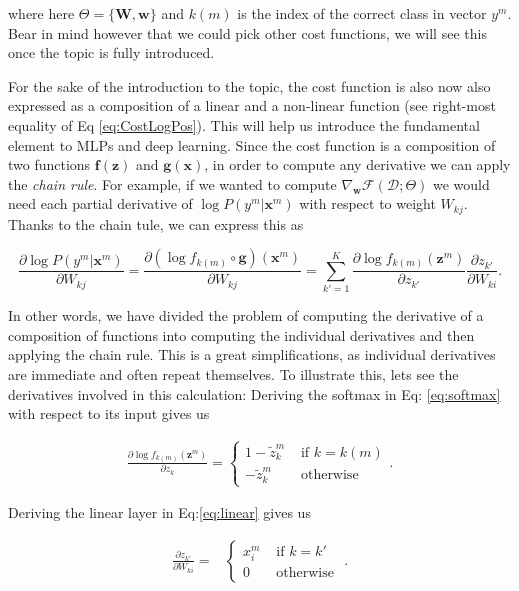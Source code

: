 where here $\Theta=\{\mathbf{W}, \mathbf{w}\}$ and $k(m)$ is the index of the correct class in vector $y^m$. 
Bear in mind however that we could pick other cost functions, we will see this once the topic is fully introduced.

For the sake of the introduction to the topic, the cost function is also now also expressed as a composition of a linear and a non-linear function (see right-most equality of Eq \ref{eq:CostLogPos}). This will help us introduce the fundamental element to MLPs and deep learning. Since the cost function is a composition of two functions  $\mathbf{f}(\mathbf{z})$ and $\mathbf{g}(\mathbf{x})$, in order to compute any derivative we can apply the \textit{chain rule}. For example, if we wanted to compute $\nabla_\mathbf{w}\mathcal{F}(\mathcal{D};\Theta)$ we would need each partial derivative of $\log P(y^m | \mathbf{x}^m)$ with respect to weight $W_{kj}$. Thanks to the chain tule, we can express this as

\begin{equation}
\frac{\partial \log P(y^m | \mathbf{x}^m) }{\partial W_{kj}} = \frac{\partial (\log f_{k(m)} \circ \mathbf{g})(\mathbf{x}^m) }{\partial W_{kj}} = \sum_{k'=1}^K\frac{\partial \log f_{k(m)}(\mathbf{z}^m)}{\partial z_{k'}}\frac{\partial z_{k'}}{\partial W_{ki}}.
\label{eq:gradlogPycx}
\end{equation}

In other words, we have divided the problem of computing the derivative of a composition of functions into computing the individual derivatives and then applying the chain rule. This is a great simplifications, as individual derivatives are immediate and often repeat themselves. To illustrate this, lets see the derivatives involved in this calculation: Deriving the softmax in Eq: \ref{eq:softmax} with respect to its input gives us 

\begin{align}
\frac{\partial \log f_{k(m)}(\mathbf{z}^m)}{\partial z_{k}} = 
  \begin{cases}
      1 - \tilde{z}_k^m  &  \mbox{ if } k = k(m)\\ 
      -\tilde{z}_k^m    &  \mbox{ otherwise } 
  \end{cases}. 
  \label{eq:patialSoftmax}
\end{align}

\noindent Deriving the linear layer in Eq:\ref{eq:linear} gives us

\begin{align}
\frac{\partial z_{k'}}{\partial W_{ki}} = 
  &\begin{cases}
      x_i^m  &  \mbox{ if } k = k'\\ 
      0    &  \mbox{ otherwise } 
  \end{cases}.
  \label{eq:partialLinear}
\end{align}

